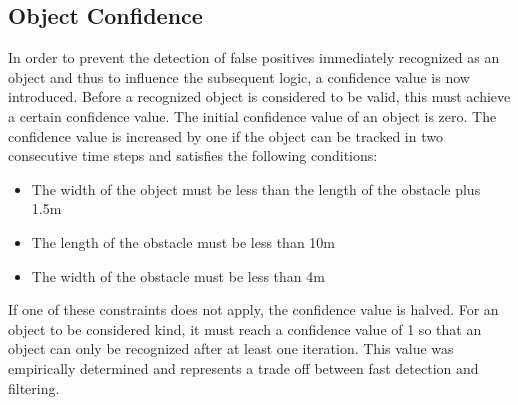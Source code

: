 \documentclass[11pt,oneside,openright]{mpreport}
\begin{document}
\subsection{Object Confidence}

In order to prevent the detection of false positives immediately recognized as an object and thus to influence the subsequent logic, a confidence value is now introduced. 
Before a recognized object is considered to be valid, this must achieve a certain confidence value. The initial confidence value of an object is zero. 
The confidence value is increased by one if the object can be tracked in two consecutive time steps and satisfies the following conditions:

\begin{itemize}
\item The width of the object must be less than the length of the obstacle plus 1.5m
\item The length of the obstacle must be less than 10m
\item The width of the obstacle must be less than 4m
\end{itemize}
If one of these constraints does not apply, the confidence value is halved. For an object to be considered kind, it must reach a confidence value of 1 so that an object can only be 
recognized after at least one iteration. This value was empirically determined and represents a trade off between fast detection and filtering.
\end{document}
